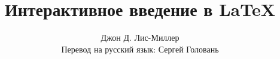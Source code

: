 \newcommand{\wllogo}{\textbf{Overleaf}}

\newcommand{\fileuri}{https://raw.github.com/sgolovan/latex-course/master/ru}

\newcommand{\wlserver}{https://www.overleaf.com}
\newcommand{\wlnewdoc}[1]{\wlserver/docs?snip\_uri=\fileuri/#1\&splash=none}

\def\tikzname{Ti\emph{k}Z}

\newcommand*\keystroke[1]{%
  \tikz[baseline=(key.base)]
    \node[%
      draw,
      fill=white,
      drop shadow={shadow xshift=0.25ex,shadow yshift=-0.25ex,fill=black,opacity=0.75},
      rectangle,
      rounded corners=2pt,
      inner sep=1pt,
      line width=0.5pt,
      font=\scriptsize\ttfamily
    ](key) {#1\strut}
  ;
}
\newcommand{\keystrokebftt}[1]{\keystroke{\bftt{#1}}}

\newenvironment{exampletwouptinynoframe}
  {\VerbatimEnvironment
   \begin{VerbatimOut}{example.out}}
  {\end{VerbatimOut}
   \setlength{\parindent}{0pt}
   \begin{tabular}{l|l}
   \begin{minipage}{0.55\linewidth}
     \inputminted[fontsize=\scriptsize,resetmargins]{latex}{example.out}
   \end{minipage} &
   \begin{minipage}{0.35\linewidth}
     \setlength{\parskip}{6pt plus 1pt minus 1pt}%
     \raggedright\scriptsize
   \end{minipage}
   \end{tabular}}

\title{Интерактивное введение в \LaTeX}
\author{Джон Д. Лис-Миллер\\Перевод на русский язык: Сергей Головань}
